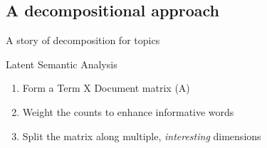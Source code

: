 \documentclass[compress]{beamer}
\begin{document}
\subsection{A decompositional approach}

\begin{frame}{A story of decomposition for topics}
\begin{block}{Latent Semantic Analysis}
\begin{enumerate}
\item Form a Term X Document matrix (A)
\item Weight the counts to enhance informative words
\item Split the matrix along multiple, \textit{interesting} dimensions
\end{enumerate}
\end{block}


\end{frame}
\end{document}

